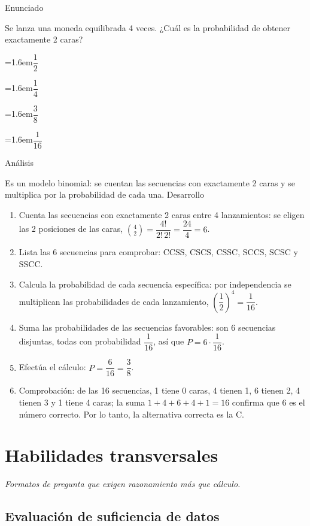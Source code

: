 \documentclass[10pt,a4paper,twocolumn]{article}
\newcommand{\alternativa}[2]{\par\noindent\hangindent=1.6em\hangafter=1\makebox[1.6em][l]{\tecla{#1}}#2\par}
\newcommand{\clave}[1]{\par\smallskip{\sffamily\footnotesize\color{esmeralda} Clave \teclaok{#1}}\par}
\begin{document}
\begin{ejemplo}
{\sffamily\footnotesize\color{zinc500} Enunciado}\par
Se lanza una moneda equilibrada 4 veces. ¿Cuál es la probabilidad de obtener exactamente 2 caras?
\alternativa{A}{$\dfrac{1}{2}$}
\alternativa{B}{$\dfrac{1}{4}$}
\alternativa{C}{$\dfrac{3}{8}$}
\alternativa{D}{$\dfrac{1}{16}$}
\clave{C}
{\sffamily\footnotesize\color{zinc500} Análisis}\par Es un modelo binomial: se cuentan las secuencias con exactamente 2 caras y se multiplica por la probabilidad de cada una.
{\sffamily\footnotesize\color{zinc500} Desarrollo}
\begin{enumerate}
  \item Cuenta las secuencias con exactamente 2 caras entre 4 lanzamientos: se eligen las 2 posiciones de las caras, $\binom{4}{2} = \dfrac{4!}{2!\,2!} = \dfrac{24}{4} = 6$.
  \item Lista las 6 secuencias para comprobar: CCSS, CSCS, CSSC, SCCS, SCSC y SSCC.
  \item Calcula la probabilidad de cada secuencia específica: por independencia se multiplican las probabilidades de cada lanzamiento, $\left(\dfrac{1}{2}\right)^4 = \dfrac{1}{16}$.
  \item Suma las probabilidades de las secuencias favorables: son $6$ secuencias disjuntas, todas con probabilidad $\dfrac{1}{16}$, así que $P = 6\cdot\dfrac{1}{16}$.
  \item Efectúa el cálculo: $P = \dfrac{6}{16} = \dfrac{3}{8}$.
  \item Comprobación: de las 16 secuencias, 1 tiene 0 caras, 4 tienen 1, 6 tienen 2, 4 tienen 3 y 1 tiene 4 caras; la suma $1+4+6+4+1 = 16$ confirma que $6$ es el número correcto. Por lo tanto, la alternativa correcta es la C.
\end{enumerate}
\end{ejemplo}

\section{Habilidades transversales}

{\itshape\color{zinc700} Formatos de pregunta que exigen razonamiento más que cálculo.}

\subsection{Evaluación de suficiencia de datos}
\end{document}
